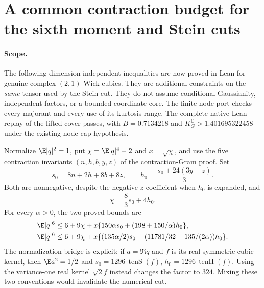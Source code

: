 \section{A common contraction budget for the sixth moment and Stein cuts}
\label{sec:joint-sixth-formal-20261022}
\paragraph{Scope.}
The following dimension-independent inequalities are now proved in Lean for genuine
complex $(2,1)$ Wick cubics. They are additional constraints on the \emph{same}
tensor used by the Stein cut. They do not assume conditional Gaussianity,
independent factors, or a bounded coordinate core. The finite-node port checks every majorant and every use of its kurtosis
range. The complete native Lean replay of the lifted cover passes, with
$B=0.7134218$ and $K_G^{\mathbb C}>1.401695322458$ under the existing
node-cap hypothesis.

Normalize $\E|q|^2=1$, put $\chi=\E|q|^4-2$ and $x=\sqrt\chi$, and use the
five contraction invariants $(n,h,b,y,z)$ of the contraction-Gram proof. Set
\[
 s_0=8n+2h+8b+8z,\qquad
 h_0=\frac{s_0+24(3y-z)}3.
\]
Both are nonnegative, despite the negative $z$ coefficient when $h_0$ is
expanded, and
\[
 \chi=\frac83s_0+4h_0.
\]
For every $\alpha>0$, the two proved bounds are
\begin{align}
 \E|q|^6&\le6+9\chi+x\{150\alpha s_0+(198+150/\alpha)h_0\},
 \label{eq:joint-sixth-formal-triangle}\\
 \E|q|^6&\le6+9\chi+x\{(135\alpha/2)s_0+
 (11781/32+135/(2\alpha))h_0\}.
 \label{eq:joint-sixth-formal-young}
\end{align}
The normalization bridge is explicit: if $a=\Re q$ and $f$ is its real
symmetric cubic kernel, then $\E a^2=1/2$ and
$s_0=1296\,\operatorname{tenS}(f)$,
$h_0=1296\,\operatorname{tenH}(f)$.
Using the variance-one real kernel $\sqrt2 f$ instead changes the factor to
$324$. Mixing these two conventions would invalidate the numerical cut.

